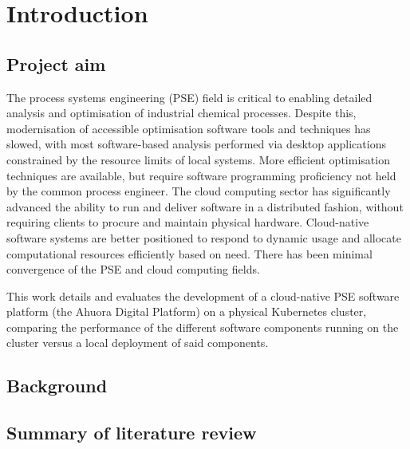 \chapter{Introduction}
\label{sec:intro}

\section{Project aim}

The process systems engineering (PSE) field is critical to enabling detailed analysis and optimisation of industrial chemical processes. Despite this, modernisation of accessible optimisation software tools and techniques has slowed, with most software-based analysis performed via desktop applications constrained by the resource limits of local systems. More efficient optimisation techniques are available, but require software programming proficiency not held by the common process engineer. The cloud computing sector has significantly advanced the ability to run and deliver software in a distributed fashion, without requiring clients to procure and maintain physical hardware. Cloud-native software systems are better positioned to respond to dynamic usage and allocate computational resources efficiently based on need. There has been minimal convergence of the PSE and cloud computing fields.

This work details and evaluates the development of a cloud-native PSE software platform (the Ahuora Digital Platform) on a physical Kubernetes cluster, comparing the performance of the different software components running on the cluster versus a local deployment of said components.

\section{Background}

\section{Summary of literature review}